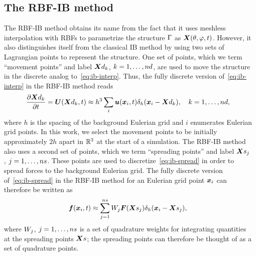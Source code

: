 \subsection{The RBF-IB method}\label{sec:rbfib}

The RBF-IB method obtains its name from the fact that it uses meshless interpolation with RBFs to parametrize the
structure $\Gamma$ as $\boldsymbol{X}(\theta, \varphi, t)$. However, it also distinguishes itself from the classical IB
method by using two sets of Lagrangian points to represent the structure. One set of points, which we term
``movement points'' and label $\data\X_k$, $k=1, \ldots, \data\cardinality$, are used to move the structure in the
discrete analog to~\eqref{eq:ib-interp}. Thus, the fully discrete version of~\eqref{eq:ib-interp} in the RBF-IB
method reads
\begin{equation}\label{eq:ib-interp-disc}
    \frac{\partial\data\X_k}{\partial t} = \U(\data\X_k, t) \approx h^3 \sum_i \u(\x_i, t) \Dirac_h(\x_i-\data\X_k), \quad k=1, \ldots, \data\cardinality,
\end{equation}
where $h$ is the spacing of the background Eulerian grid and $i$ enumerates Eulerian grid points. %
In this work, we select the
movement points to be initially approximately $2h$ apart in $\mathbb{R}^3$ at the start of a simulation. The RBF-IB method
also uses a second set of points, which we term ``spreading points'' and label $\Xsj$,
$j=1, \ldots, \sample\cardinality$. These points are used to discretize~\eqref{eq:ib-spread} in order to spread
forces to the background Eulerian grid. The fully discrete version of~\eqref{eq:ib-spread} in the RBF-IB method
for an Eulerian grid point $\boldsymbol{x}_i$ can therefore be written as
\begin{align}\label{eq:ib-spread-disc}
        \f(\x_i, t) \approx\sum\limits_{j=1}^{\sample\cardinality} \weight[j]\F(\Xsj) \Dirac_h(\x_i-\Xsj),
\end{align}
where $\weight[j]$, $j=1, \ldots, \sample\cardinality$ is a set of quadrature weights for integrating quantities
at the spreading points $\sample\X$; the spreading points can therefore be thought of as a set of quadrature
points.%

